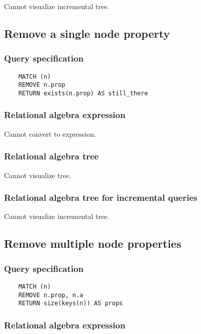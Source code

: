	Cannot visualize incremental tree.
	\subsection{Remove a single node property}

	\subsubsection*{Query specification}

	\begin{lstlisting}
	MATCH (n)
	REMOVE n.prop
	RETURN exists(n.prop) AS still_there
	\end{lstlisting}


	\subsubsection*{Relational algebra expression}

	Cannot convert to expression.

	\subsubsection*{Relational algebra tree}

	Cannot visualize tree.

	\subsubsection*{Relational algebra tree for incremental queries}

	Cannot visualize incremental tree.
	\subsection{Remove multiple node properties}

	\subsubsection*{Query specification}

	\begin{lstlisting}
	MATCH (n)
	REMOVE n.prop, n.a
	RETURN size(keys(n)) AS props
	\end{lstlisting}


	\subsubsection*{Relational algebra expression}

